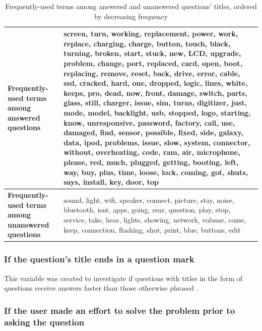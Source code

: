 \documentclass[preprint]{elsarticle}\usepackage[]{graphicx}\usepackage[]{color}
\begin{document}
\begin{table}[!htbp]
\centering
\begin{tabular}{|L{4cm}|L{8cm}|}
  \hline
 \textbf{Frequently-used terms among answered questions} & screen, turn, working, replacement, power, work, replace, charging, charge, button, touch, black, turning, broken, start, stuck, new, LCD, upgrade, problem, change, port, replaced, card, open, boot, replacing, remove, reset, back, drive, error, cable, ssd, cracked, hard, one, dropped, logic, lines, white, keeps, pro, dead, now, front, damage, switch, parts, glass, still, charger, issue, sim, turns, digitizer, just, mode, model, backlight, usb, stopped, logo, starting, know, unresponsive, password, factory, call, use, damaged, find, sensor, possible, fixed, side, galaxy, data, ipod, problems, issue, slow, system, connector, without, overheating, code, ram, air, microphone, please, red, much, plugged, getting, booting, left, way, buy, plus, time, loose, lock, coming, got, shuts, says, install, key, door, top \\
  \hline
  \textbf{Frequently-used terms among unanswered questions} & sound, light, wifi, speaker, connect, picture, stay, noise, bluetooth, isnt, apps, going, rear, question, play, stop, service, take, hear, lights, showing, network, volume, come, keep, connection, flashing, shut, print, blue, buttons, edit \\ 
   \hline
\end{tabular}
\caption{Frequently-used terms among answered and unanswered questions' titles, ordered by decreasing frequency}
\label{table:frequentterms}
\end{table}


\subsubsection{If the question's title ends in a question mark}

This variable was created to investigate if questions with titles in the form of questions receive answers faster than those otherwise phrased \cite{Bhat2014}. 


\subsubsection{If the user made an effort to solve the problem prior to asking the question}
\end{document}
